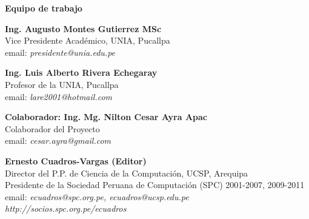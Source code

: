 \begin{center}
{\bf \Huge Equipo de trabajo}
\end{center}
\vspace{1cm}

\begin{center}
\textbf{Ing. Augusto Montes Gutierrez MSc}\\
Vice Presidente Académico, UNIA, Pucallpa\\
email: \textit{presidente@unia.edu.pe}
\end{center}

\begin{center}
\textbf{Ing. Luis Alberto Rivera Echegaray}\\
Profesor de la UNIA, Pucallpa\\
email: \textit{lare2001@hotmail.com}
\end{center}

\begin{center}
\textbf{Colaborador: Ing. Mg. Nilton Cesar Ayra Apac}\\
Colaborador del Proyecto\\
email: \textit{cesar.ayra@gmail.com}
\end{center}

\begin{center}
\textbf{Ernesto Cuadros-Vargas (Editor)}\\
Director del P.P. de Ciencia de la Computación, UCSP, Arequipa\\
Presidente de la Sociedad Peruana de Computación (SPC) 2001-2007, 2009-2011\\
email: \textit{ecuadros@spc.org.pe, ecuadros@ucsp.edu.pe}\\
\textit{http://socios.spc.org.pe/ecuadros}
\end{center}

\newpage
